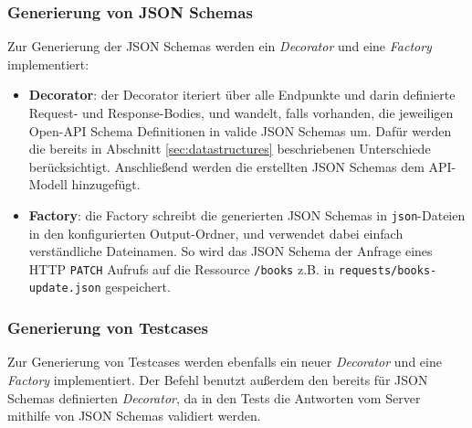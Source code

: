 \subsubsection{Generierung von JSON Schemas}
Zur Generierung der JSON Schemas werden ein \emph{Decorator} und eine \emph{Factory} implementiert:

\begin{itemize}
	\item \textbf{Decorator}: der Decorator iteriert über alle Endpunkte und darin definierte Request- und Response-Bodies, und wandelt, falls vorhanden, die jeweiligen Open-API Schema Definitionen in valide JSON Schemas um. Dafür werden die bereits in Abschnitt \ref{sec:datastructures} beschriebenen Unterschiede berücksichtigt. Anschließend werden die erstellten JSON Schemas dem API-Modell hinzugefügt.
	\item \textbf{Factory}: die Factory schreibt die generierten JSON Schemas in \lstinline|json|-Dateien in den konfigurierten Output-Ordner, und verwendet dabei einfach verständliche Dateinamen. So wird das JSON Schema der Anfrage eines HTTP \lstinline|PATCH| Aufrufs auf die Ressource \lstinline|/books| z.B. in \lstinline|requests/books-update.json| gespeichert.
\end{itemize}

\subsubsection{Generierung von Testcases}
Zur Generierung von Testcases werden ebenfalls ein neuer \emph{Decorator} und eine \emph{Factory} implementiert. Der Befehl benutzt außerdem den bereits für JSON Schemas definierten \emph{Decorator}, da in den Tests die Antworten vom Server mithilfe von JSON Schemas validiert werden.

